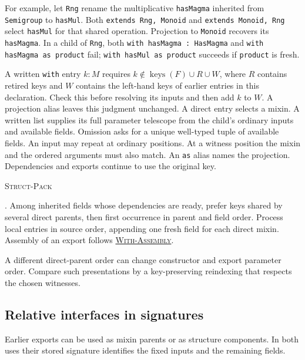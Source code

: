 \documentclass{article}
\newcommand{\ttt}[1]{\texttt{#1}}
\newcommand{\keys}{\operatorname{keys}}
\newcommand{\rdefn}[1]{\hypertarget{rule-#1}{\textsc{#1}}}
\newcommand{\ruse}[1]{\hyperlink{rule-#1}{\textsc{#1}}}
\begin{document}
For example, let \ttt{Rng} rename the multiplicative \ttt{hasMagma}
inherited from \ttt{Semigroup} to \ttt{hasMul}. Both
\ttt{extends Rng, Monoid} and \ttt{extends Monoid, Rng} select
\ttt{hasMul} for that shared operation. Projection to \ttt{Monoid}
recovers its \ttt{hasMagma}. In a child of \ttt{Rng}, both
\ttt{with hasMagma : HasMagma} and \ttt{with hasMagma as product}
fail; \ttt{with hasMul as product} succeeds if \ttt{product} is fresh.

A written \ttt{with} entry $k:M$ requires
$k\notin\keys(F)\cup R\cup W$, where $R$ contains retired keys and $W$ contains the left-hand keys of earlier
entries in this declaration. Check this before resolving its inputs and
then add $k$ to $W$. A projection alias leaves this judgment unchanged.
A direct entry selects a mixin. A written list supplies its
full parameter telescope from the child's ordinary inputs and available
fields. Omission asks for a unique well-typed tuple of available fields.
An input may repeat at ordinary positions. At a witness position the
mixin and the ordered arguments must also match. An \ttt{as} alias names
the projection. Dependencies and exports continue to use the original key.

\rdefn{Struct-Pack}. Among inherited fields whose dependencies are ready,
prefer keys shared by several direct parents, then first occurrence in
parent and field order. Process local entries in source order, appending
one fresh field for each direct mixin. Assembly of
an export follows \ruse{With-Assembly}.

A different direct-parent order can change constructor and export
parameter order. Compare such presentations by a key-preserving
reindexing that respects the chosen witnesses.

\subsection{Relative interfaces in signatures}

Earlier exports can be used as mixin parents or as structure components.
In both uses their stored signature identifies the fixed inputs and the
remaining fields.
\end{document}
